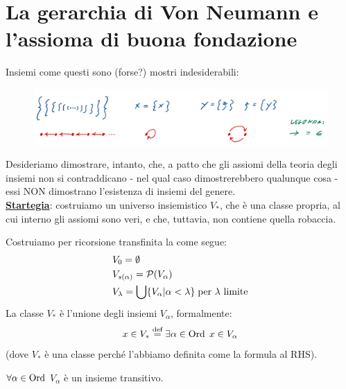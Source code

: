 \section{La gerarchia di Von Neumann e l'assioma di buona fondazione}
Insiemi come questi sono (forse?) mostri indesiderabili:

\begin{figure}[H]
	\centering\includegraphics[width = 11.5cm]{immagini/mostri.png}
\end{figure}

Desideriamo dimostrare, intanto, che, a patto che gli assiomi della teoria degli insiemi non si contraddicano - nel qual caso dimostrerebbero qualunque cosa - essi NON dimostrano l'esistenza di insiemi del genere.\\
\textbf{\underline{Startegia}}: costruiamo un universo insiemistico $V_*$, che è una classe propria, al cui interno gli assiomi sono veri, e che, tuttavia, non contiene quella robaccia.

\begin{definition}
	Costruiamo per ricorsione transfinita la  come segue:
	\begin{align*}
		&V_0 = \emptyset \\
		&V_{s(\alpha)} = \mathcal{P}(V_\alpha) \\
		&V_\lambda = \bigcup\{V_\alpha | \alpha < \lambda\} \; \text{per $\lambda$ limite}
	\end{align*}
	La classe $V_*$ è l'unione degli insiemi $V_\alpha$, formalmente:
	\[ x \in V_* \overset{\text{def}}{=} \exists \alpha \in \operatorname{Ord} \; x \in V_\alpha
		\]
	(dove $V_*$ è una classe perché l'abbiamo definita come la formula al RHS).
\end{definition}

\begin{lemma}
	$\forall \alpha \in \operatorname{Ord}$ $V_\alpha$ è un insieme transitivo.
\end{lemma}

